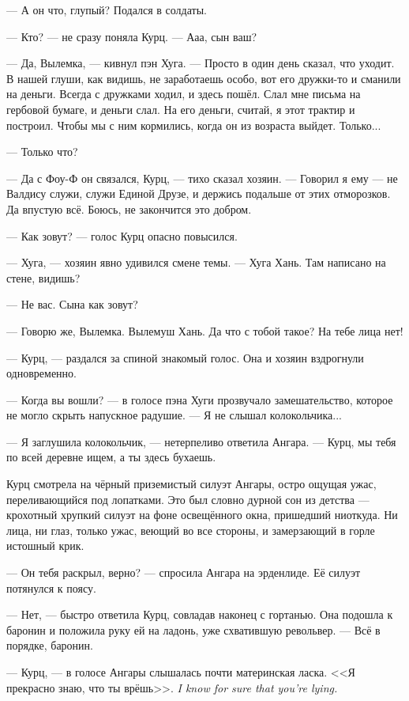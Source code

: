 --- А он что, глупый?
Подался в солдаты.

--- Кто? --- не сразу поняла Курц.
--- Ааа, сын ваш?

--- Да, Вылемка, --- кивнул пэн Хуга.
--- Просто в один день сказал, что уходит.
В нашей глуши, как видишь, не заработаешь особо, вот его дружки-то и сманили на деньги.
Всегда с дружками ходил, и здесь пошёл.
Слал мне письма на гербовой бумаге, и деньги слал.
На его деньги, считай, я этот трактир и построил.
Чтобы мы с ним кормились, когда он из возраста выйдет.
Только...

--- Только что?

--- Да с Фоу-Ф он связался, Курц, --- тихо сказал хозяин.
--- Говорил я ему --- не Валдису служи, служи Единой Друзе, и держись подальше от этих отморозков.
Да впустую всё.
Боюсь, не закончится это добром.

--- Как зовут? --- голос Курц опасно повысился.

--- Хуга, --- хозяин явно удивился смене темы.
--- Хуга Хань.
Там написано на стене, видишь?

--- Не вас.
Сына как зовут?

--- Говорю же, Вылемка.
Вылемуш Хань.
Да что с тобой такое?
На тебе лица нет!

--- Курц, --- раздался за спиной знакомый голос.
Она и хозяин вздрогнули одновременно.

--- Когда вы вошли? --- в голосе пэна Хуги прозвучало замешательство, которое не могло скрыть напускное радушие.
--- Я не слышал колокольчика...

--- Я заглушила колокольчик, --- нетерпеливо ответила Ангара.
--- Курц, мы тебя по всей деревне ищем, а ты здесь бухаешь.

Курц смотрела на чёрный приземистый силуэт Ангары, остро ощущая ужас, переливающийся под лопатками.
Это был словно дурной сон из детства --- крохотный хрупкий силуэт на фоне освещённого окна, пришедший ниоткуда.
Ни лица, ни глаз, только ужас, веющий во все стороны, и замерзающий в горле истошный крик.

--- Он тебя раскрыл, верно? --- спросила Ангара на эрденлиде.
Её силуэт потянулся к поясу.

--- Нет, --- быстро ответила Курц, совладав наконец с гортанью.
Она подошла к баронин и положила руку ей на ладонь, уже схватившую револьвер.
--- Всё в порядке, баронин.

--- Курц, --- в голосе Ангары слышалась почти материнская ласка.
{<<Я прекрасно знаю, что ты врёшь>>.}
{\textit{I know for sure that you're lying.}}


